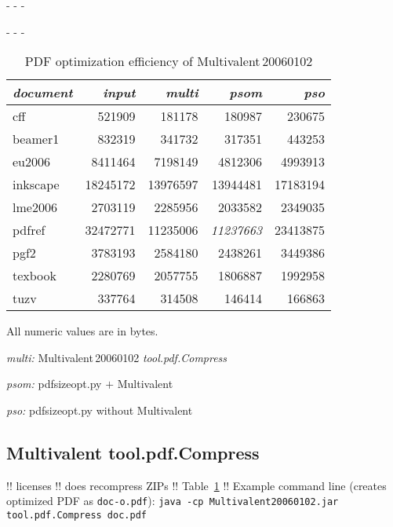 \documentclass{ltugproc}
\def\cmd{\textsf}
\def\captiontop#1{%
  \advance\abovecaptionskip-\belowcaptionskip
  \advance\belowcaptionskip\abovecaptionskip
  \advance\abovecaptionskip-\belowcaptionskip
  \abovecaptionskip-\abovecaptionskip
  \caption{#1}%
  \advance\abovecaptionskip-\belowcaptionskip
  \advance\belowcaptionskip\abovecaptionskip
  \advance\abovecaptionskip-\belowcaptionskip
  \abovecaptionskip-\abovecaptionskip
}
\begin{document}
\begin{table}
\captiontop{PDF optimization efficiency
of Multivalent\,20060102}\label{tab:eff-multivalent}
\par\small\noindent\hfil
\advance\tabcolsep-2pt  %
\begin{tabular}{@{}lrrrr@{}}
\toprule
\emph{document} & \emph{input} & \emph{multi} & \emph{psom} & \emph{pso} \\\midrule
cff         &   521909 &    181178 &    180987 &   230675 \\
beamer1     &   832319 &    341732 &    317351 &   443253 \\
eu2006      &  8411464 &   7198149 &   4812306 &  4993913 \\
inkscape    & 18245172 &  13976597 &  13944481 & 17183194 \\
lme2006     &  2703119 &   2285956 &   2033582 &  2349035 \\
pdfref      & 32472771 &  11235006 &  \emph{11237663} & 23413875 \\
pgf2        &  3783193 &   2584180 &   2438261 &  3449386 \\
texbook     &  2280769 &   2057755 &   1806887 &  1992958 \\
tuzv        &   337764 &    314508 &    146414 &   166863 \\
\bottomrule
\end{tabular}
\par\bigskip
\par\noindent All numeric values are in bytes.
\par\noindent\emph{multi:} Multivalent\,20060102 \emph{tool.pdf.Compress}
\par\noindent\emph{psom:} \cmd{pdfsizeopt.py} $+$ Multivalent
\par\noindent\emph{pso:} \cmd{pdfsizeopt.py} without Multivalent
\end{table}


\subsection{Multivalent tool.pdf.Compress}

!! licenses
!! does recompress ZIPs
!! Table~\ref{tab:eff-multivalent}
!! Example command line (creates optimized PDF as \texttt{doc-o.pdf}):
\texttt{java -cp Multivalent20060102.jar tool.pdf.Compress doc.pdf}
\end{document}
